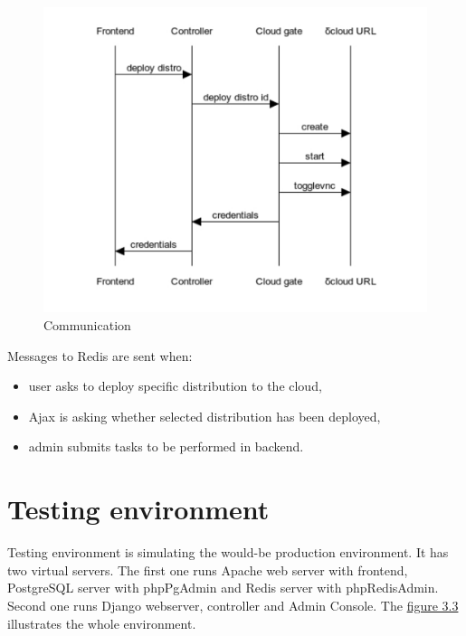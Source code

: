 \documentclass[thesis=B,english]{FITthesis}[2013/04/26]
\begin{document}
\begin{center}
\begin{figure}[h!]
	\includegraphics[totalheight=295pt]{images/sequence.pdf}
	\caption{Communication}
	\label{fig: sequence}
\end{figure}
\end{center}

Messages to Redis are sent when:

\begin{itemize}
	\item user asks to deploy specific distribution to the cloud,
	\item Ajax is asking whether selected distribution has been deployed,
	\item admin submits tasks to be performed in backend.
\end{itemize}

\section{Testing environment}
\label{section:testing}
Testing environment is simulating the would-be production environment. It has two virtual servers. The first one runs Apache web server with frontend, PostgreSQL server with phpPgAdmin and Redis server with phpRedisAdmin. Second one runs Django webserver, controller and Admin Console. The \hyperref[fig: tndw-test]{figure 3.3} illustrates the whole environment.
\end{document}
